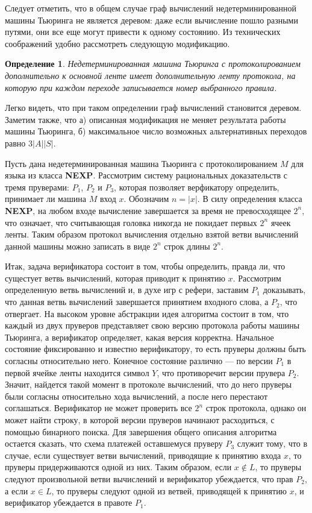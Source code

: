 \documentclass[14pt, a4paper, russian]{report}
\newtheorem{definition}{\indent Определение}
\begin{document}
        Следует отметить, что в общем случае граф вычислений недетерминированной машины Тьюринга не является деревом: даже если вычисление пошло разными путями, они все еще могут привести к одному состоянию. Из технических соображений удобно рассмотреть следующую модификацию.

        \begin{definition}
            Недетерминированная машина Тьюринга с протоколированием дополнительно к основной ленте имеет дополнительную ленту протокола, на которую при каждом переходе записывается номер выбранного правила.
        \end{definition}

        Легко видеть, что при таком определении граф вычислений становится деревом. Заметим также, что а) описанная модификация не меняет результата работы машины Тьюринга, б) максимальное число возможных альтернативных переходов равно $3|A||S|$.

        Пусть дана недетерминированная машина Тьюринга с протоколированием $M$ для языка из класса \textbf{NEXP}. Рассмотрим систему рациональных доказательств с тремя пруверами: $P_1$, $P_2$ и $P_3$, которая позволяет верфикатору определить, принимает ли машина $M$ вход $x$. Обозначим $n = |x|$. В силу определения класса \textbf{NEXP}, на любом входе вычисление завершается за время не превосходящее $2 ^ n$, что означает, что считывающая головка никогда не покидает первых $2^n$ ячеек ленты. Таким образом протокол вычисления отдельно взятой ветви вычислений данной машины можно записать в виде $2^n$ строк длины $2^n$.

        Итак, задача верификатора состоит в том, чтобы определить, правда ли, что сущестует ветвь вычислений, которая приводит к принятию $x$. Рассмотрим определенную ветвь вычислений и, в духе игр с рефери, заставим $P_1$ доказывать, что данная ветвь вычислений завершается принятием входного слова, а $P_2$, что отвергает. На высоком уровне абстракции идея алгоритма состоит в том, что каждый из двух пруверов представляет свою версию протокола работы машины Тьюринга, а верификатор определяет, какая версия корректна. Начальное состояние фиксированно и известно верификатору, то есть пруверы должны быть согласны относительно него. Конечное состояние различно --- по версии $P_1$ в первой ячейке ленты находится символ $Y$, что противоречит версии прувера $P_2$. Значит, найдется такой момент в протоколе вычислений, что до него пруверы были согласны относительно хода вычислений, а после него перестают соглашаться.
        Верификатор не может проверить все $2^n$ строк протокола, однако он может найти строку, в которой версии пруверов начинают расходиться, с помощью бинарного поиска. Для завершения общего описания алгоритма остается сказать, что схема платежей оставшемуся пруверу $P_3$ служит тому, что в случае, если существует ветви вычислений, приводящие к принятию входа $x$, то пруверы придерживаются одной из них. Таким образом, если $x \notin L$, то пруверы следуют произвольной ветви вычислений и верификатор убеждается, что прав $P_2$, а если $x \in L$, то пруверы следуют одной из ветвей, приводящей к принятию $x$, и верификатор убеждается в правоте $P_1$.
\end{document}
